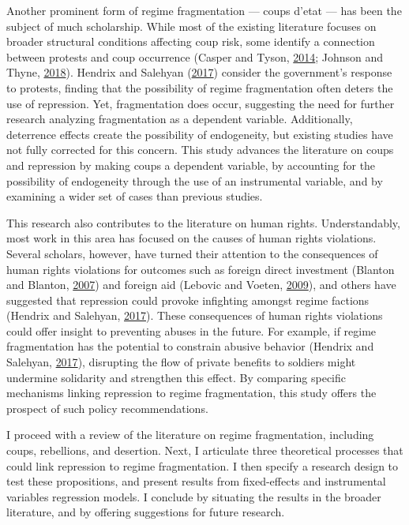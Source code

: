 \documentclass[
  12pt,
]{article}
\begin{document}
Another prominent form of regime fragmentation --- coups d'etat --- has been the subject of much scholarship. While most of the existing literature focuses on broader structural conditions affecting coup risk, some identify a connection between protests and coup occurrence (Casper and Tyson, \protect\hyperlink{ref-Casper2014}{2014}; Johnson and Thyne, \protect\hyperlink{ref-Johnson2018}{2018}). Hendrix and Salehyan (\protect\hyperlink{ref-Hendrix2017}{2017}) consider the government's response to protests, finding that the possibility of regime fragmentation often deters the use of repression. Yet, fragmentation does occur, suggesting the need for further research analyzing fragmentation as a dependent variable. Additionally, deterrence effects create the possibility of endogeneity, but existing studies have not fully corrected for this concern. This study advances the literature on coups and repression by making coups a dependent variable, by accounting for the possibility of endogeneity through the use of an instrumental variable, and by examining a wider set of cases than previous studies.

This research also contributes to the literature on human rights. Understandably, most work in this area has focused on the causes of human rights violations. Several scholars, however, have turned their attention to the consequences of human rights violations for outcomes such as foreign direct investment (Blanton and Blanton, \protect\hyperlink{ref-Blanton2007}{2007}) and foreign aid (Lebovic and Voeten, \protect\hyperlink{ref-Lebovic2009}{2009}), and others have suggested that repression could provoke infighting amongst regime factions (Hendrix and Salehyan, \protect\hyperlink{ref-Hendrix2017}{2017}). These consequences of human rights violations could offer insight to preventing abuses in the future. For example, if regime fragmentation has the potential to constrain abusive behavior (Hendrix and Salehyan, \protect\hyperlink{ref-Hendrix2017}{2017}), disrupting the flow of private benefits to soldiers might undermine solidarity and strengthen this effect. By comparing specific mechanisms linking repression to regime fragmentation, this study offers the prospect of such policy recommendations.

I proceed with a review of the literature on regime fragmentation, including coups, rebellions, and desertion. Next, I articulate three theoretical processes that could link repression to regime fragmentation. I then specify a research design to test these propositions, and present results from fixed-effects and instrumental variables regression models. I conclude by situating the results in the broader literature, and by offering suggestions for future research.
\end{document}
